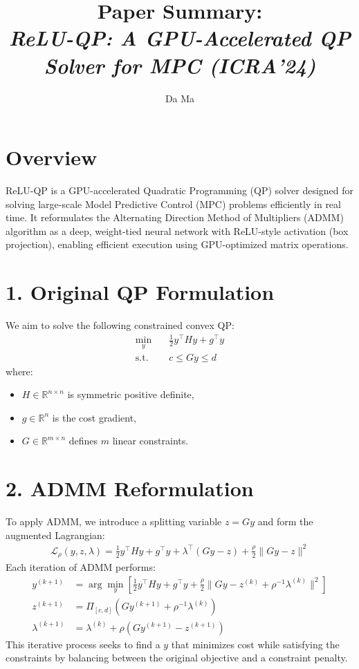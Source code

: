 \documentclass[11pt]{article}
\title{Paper Summary: \\
\emph{ReLU-QP: A GPU-Accelerated QP Solver for MPC (ICRA'24)}}
\author{Da Ma}
\date{}
\begin{document}
\maketitle

\section*{Overview}
ReLU-QP is a GPU-accelerated Quadratic Programming (QP) solver designed for solving large-scale Model Predictive Control (MPC) problems efficiently in real time. It reformulates the Alternating Direction Method of Multipliers (ADMM) algorithm as a deep, weight-tied neural network with ReLU-style activation (box projection), enabling efficient execution using GPU-optimized matrix operations.

\section*{1. Original QP Formulation}
We aim to solve the following constrained convex QP:
\begin{align*}
    \min_{y} \quad & \frac{1}{2} y^\top H y + g^\top y \\
    \text{s.t.} \quad & c \leq G y \leq d
\end{align*}
where:
\begin{itemize}
    \item $H \in \mathbb{R}^{n \times n}$ is symmetric positive definite,
    \item $g \in \mathbb{R}^n$ is the cost gradient,
    \item $G \in \mathbb{R}^{m \times n}$ defines $m$ linear constraints.
\end{itemize}

\section*{2. ADMM Reformulation}
To apply ADMM, we introduce a splitting variable $z = G y$ and form the augmented Lagrangian:
\begin{align*}
    \mathcal{L}_\rho(y, z, \lambda) = \frac{1}{2} y^\top H y + g^\top y + \lambda^\top(G y - z) + \frac{\rho}{2} \| G y - z \|^2
\end{align*}
Each iteration of ADMM performs:
\begin{align*}
    y^{(k+1)} &= \arg\min_y \left[ \frac{1}{2} y^\top H y + g^\top y + \frac{\rho}{2} \| G y - z^{(k)} + \rho^{-1} \lambda^{(k)} \|^2 \right] \\
    z^{(k+1)} &= \Pi_{[c, d]} \left( G y^{(k+1)} + \rho^{-1} \lambda^{(k)} \right) \\
    \lambda^{(k+1)} &= \lambda^{(k)} + \rho (G y^{(k+1)} - z^{(k+1)})
\end{align*}
This iterative process seeks to find a $y$ that minimizes cost while satisfying the constraints by balancing between the original objective and a constraint penalty.
\end{document}
